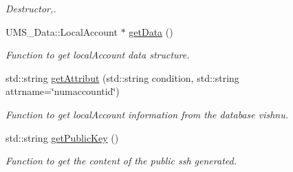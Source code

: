 \begin{DoxyCompactItemize}
\begin{DoxyCompactList}\small\item\em Destructor,. \item\end{DoxyCompactList}\item 
UMS\_\-Data::LocalAccount $\ast$ \hyperlink{classLocalAccountServer_a1bb0c984d1ce965e20ae82e3618f630b}{getData} ()
\begin{DoxyCompactList}\small\item\em Function to get localAccount data structure. \item\end{DoxyCompactList}\item 
std::string \hyperlink{classLocalAccountServer_a053a743969d33cc7eef2d921c0c0ca55}{getAttribut} (std::string condition, std::string attrname=\char`\"{}numaccountid\char`\"{})
\begin{DoxyCompactList}\small\item\em Function to get localAccount information from the database vishnu. \item\end{DoxyCompactList}\item 
std::string \hyperlink{classLocalAccountServer_a38294d33446210c15297f0dcc32130ff}{getPublicKey} ()
\begin{DoxyCompactList}\small\item\em Function to get the content of the public ssh generated. \item\end{DoxyCompactList}\end{DoxyCompactItemize}
